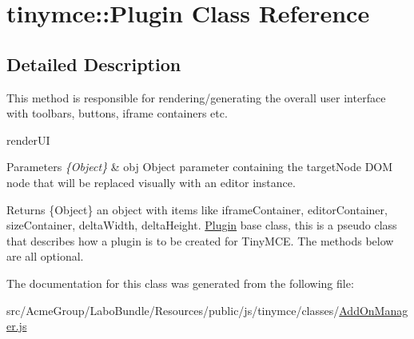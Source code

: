 \hypertarget{classtinymce_1_1_plugin}{\section{tinymce\+:\+:Plugin Class Reference}
\label{classtinymce_1_1_plugin}
}


\subsection{Detailed Description}
This method is responsible for rendering/generating the overall user interface with toolbars, buttons, iframe containers etc.

render\+U\+I 
\begin{DoxyParams}{Parameters}
{\em \{\+Object\}} & obj Object parameter containing the target\+Node D\+O\+M node that will be replaced visually with an editor instance. \\
\hline
\end{DoxyParams}
\begin{DoxyReturn}{Returns}
\{Object\} an object with items like iframe\+Container, editor\+Container, size\+Container, delta\+Width, delta\+Height. \hyperlink{classtinymce_1_1_plugin}{Plugin} base class, this is a pseudo class that describes how a plugin is to be created for Tiny\+M\+C\+E. The methods below are all optional. 
\end{DoxyReturn}


The documentation for this class was generated from the following file\+:\begin{DoxyCompactItemize}
\item 
src/\+Acme\+Group/\+Labo\+Bundle/\+Resources/public/js/tinymce/classes/\hyperlink{_add_on_manager_8js}{Add\+On\+Manager.\+js}\end{DoxyCompactItemize}
